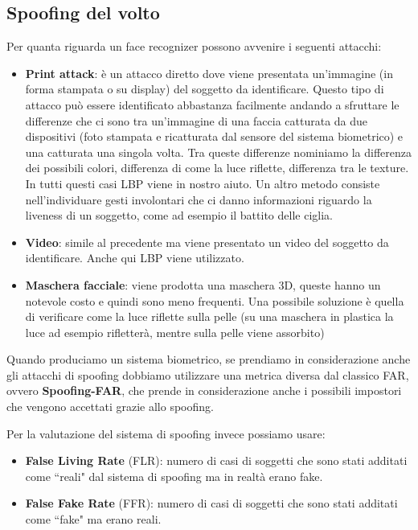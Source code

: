 \documentclass{article}
\begin{document}
\subsection{Spoofing del volto}
Per quanta riguarda un face recognizer possono avvenire i seguenti attacchi:
\begin{itemize}
    \item \textbf{Print attack}: è un attacco diretto dove viene presentata un'immagine (in forma stampata o su display) del soggetto da identificare. Questo tipo di attacco può essere identificato abbastanza facilmente andando a sfruttare le differenze che ci sono tra un'immagine di una faccia catturata da due dispositivi (foto stampata e ricatturata dal sensore del sistema biometrico) e una catturata una singola volta. Tra queste differenze nominiamo la differenza dei possibili colori, differenza di come la luce riflette, differenza tra le texture. In tutti questi casi LBP viene in nostro aiuto. Un altro metodo consiste nell'individuare gesti involontari che ci danno informazioni riguardo la liveness di un soggetto, come ad esempio il battito delle ciglia.
    \item \textbf{Video}: simile al precedente ma viene presentato un video del soggetto da identificare. Anche qui LBP viene utilizzato.
    \item \textbf{Maschera facciale}: viene prodotta una maschera 3D, queste hanno un notevole costo e quindi sono meno frequenti. Una possibile soluzione è quella di verificare come la luce riflette sulla pelle (su una maschera in plastica la luce ad esempio rifletterà, mentre sulla pelle viene assorbito)
\end{itemize}

Quando produciamo un sistema biometrico, se prendiamo in considerazione anche gli attacchi di spoofing dobbiamo utilizzare una metrica diversa dal classico FAR, ovvero \textbf{Spoofing-FAR}, che prende in considerazione anche i possibili impostori che vengono accettati grazie allo spoofing.

Per la valutazione del sistema di spoofing invece possiamo usare:
\begin{itemize}
    \item \textbf{False Living Rate} (FLR): numero di casi di soggetti che sono stati additati come ``reali" dal sistema di spoofing ma in realtà erano fake.
    \item \textbf{False Fake Rate} (FFR): numero di casi di soggetti che sono stati additati come ``fake" ma erano reali.
\end{itemize}
\end{document}
